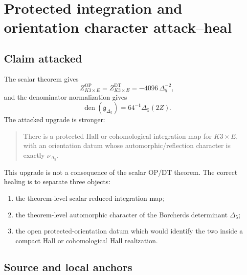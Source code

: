 \section{Protected integration and orientation character attack--heal}
\label{sec:protected-integration-orientation-attack-heal}

\providecommand{\Z}{\mathbb Z}
\providecommand{\C}{\mathbb C}
\providecommand{\Hilb}{\operatorname{Hilb}}
\providecommand{\Ext}{\operatorname{Ext}}
\providecommand{\RHom}{\operatorname{RHom}}
\providecommand{\Perf}{\operatorname{Perf}}
\providecommand{\Crit}{\operatorname{Crit}}
\providecommand{\Prim}{\operatorname{Prim}}
\providecommand{\sdim}{\operatorname{sdim}}
\providecommand{\BPS}{\mathrm{BPS}}
\providecommand{\DT}{\mathrm{DT}}
\providecommand{\PT}{\mathrm{PT}}
\providecommand{\OP}{\mathrm{OP}}
\providecommand{\nuDelta}{\nu_{\Delta_5}}
\providecommand{\Gammaeff}{\Gamma_{\mathrm{eff}}}
\providecommand{\Hall}{\mathcal H}

\subsection{Claim attacked}

The scalar theorem gives
\[
  Z_{K3\times E}^{\OP}
  =
  Z_{K3\times E}^{\DT}
  =
  -4096\,\Delta_5^{-2},
\]
and the denominator normalization gives
\[
  \operatorname{den}(\mathfrak g_{\Delta_5})
  =
  64^{-1}\Delta_5(2Z).
\]
The attacked upgrade is stronger:

\begin{quote}
There is a protected Hall or cohomological integration map for
\(K3\times E\), with an orientation datum whose automorphic/reflection
character is exactly \(\nuDelta\).
\end{quote}

This upgrade is not a consequence of the scalar OP/DT theorem.  The
correct healing is to separate three objects:

\begin{enumerate}
\item the theorem-level scalar reduced integration map;
\item the theorem-level automorphic character of the Borcherds
determinant \(\Delta_5\);
\item the open protected-orientation datum which would identify the two
inside a compact Hall or cohomological Hall realization.
\end{enumerate}

\subsection{Source and local anchors}

